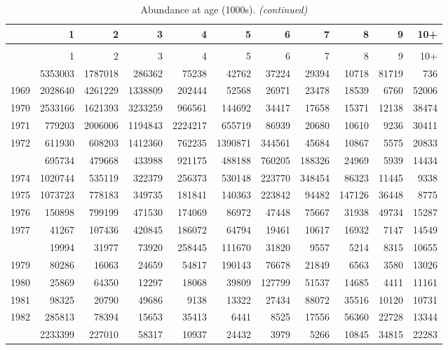 \documentclass[
]{article}
\begin{document}
\begin{longtable}[t]{lrrrrrrrrrr}
\caption{\label{tab:NAA-table}Abundance at age (1000s).}\\
\toprule
  & 1 & 2 & 3 & 4 & 5 & 6 & 7 & 8 & 9 & 10+\\
\midrule
\endfirsthead
\caption[]{Abundance at age (1000s). \textit{(continued)}}\\
\toprule
  & 1 & 2 & 3 & 4 & 5 & 6 & 7 & 8 & 9 & 10+\\
\midrule
\endhead

\endfoot
\bottomrule
\endlastfoot
1968 & 5353003 & 1787018 & 286362 & 75238 & 42762 & 37224 & 29394 & 10718 & 81719 & 736\\
1969 & 2028640 & 4261229 & 1338809 & 202444 & 52568 & 26971 & 23478 & 18539 & 6760 & 52006\\
1970 & 2533166 & 1621393 & 3233259 & 966561 & 144692 & 34417 & 17658 & 15371 & 12138 & 38474\\
1971 & 779203 & 2006006 & 1194843 & 2224217 & 655719 & 86939 & 20680 & 10610 & 9236 & 30411\\
1972 & 611930 & 608203 & 1412360 & 762235 & 1390871 & 344561 & 45684 & 10867 & 5575 & 20833\\
\addlinespace
1973 & 695734 & 479668 & 433988 & 921175 & 488188 & 760205 & 188326 & 24969 & 5939 & 14434\\
1974 & 1020744 & 535119 & 322379 & 256373 & 530148 & 223770 & 348454 & 86323 & 11445 & 9338\\
1975 & 1073723 & 778183 & 349735 & 181841 & 140363 & 223842 & 94482 & 147126 & 36448 & 8775\\
1976 & 150898 & 799199 & 471530 & 174069 & 86972 & 47448 & 75667 & 31938 & 49734 & 15287\\
1977 & 41267 & 107436 & 420845 & 186072 & 64794 & 19461 & 10617 & 16932 & 7147 & 14549\\
\addlinespace
1978 & 19994 & 31977 & 73920 & 258445 & 111670 & 31820 & 9557 & 5214 & 8315 & 10655\\
1979 & 80286 & 16063 & 24659 & 54817 & 190143 & 76678 & 21849 & 6563 & 3580 & 13026\\
1980 & 25869 & 64350 & 12297 & 18068 & 39809 & 127799 & 51537 & 14685 & 4411 & 11161\\
1981 & 98325 & 20790 & 49686 & 9138 & 13322 & 27434 & 88072 & 35516 & 10120 & 10731\\
1982 & 285813 & 78394 & 15653 & 35413 & 6441 & 8525 & 17556 & 56360 & 22728 & 13344\\
\addlinespace
1983 & 2233399 & 227010 & 58317 & 10937 & 24432 & 3979 & 5266 & 10845 & 34815 & 22283\\

\end{longtable}
\end{document}
